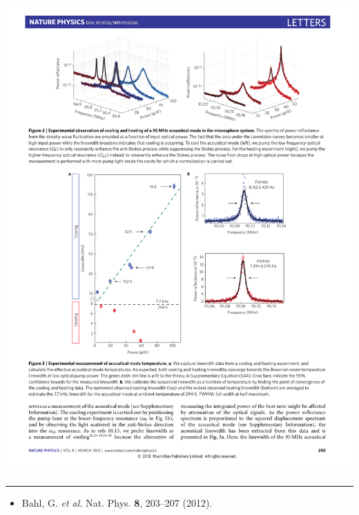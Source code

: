 \documentclass{beamer}
\def\etal{\emph{et al. }}
\begin{document}
\begin{frame}
\begin{columns}[onlytextwidth]
\begin{column}{0.4\textwidth}
\begin{center}
\includegraphics[width=1.0\columnwidth]{f7.pdf}
\end{center}
\end{column}
\end{columns}

\vspace{4em}
\noindent\rule{0.1\textwidth}{0.5pt}

\begin{itemize}
\item \tiny{Bahl, G. \etal Nat. Phys. \textbf{8}, 203–207 (2012).}
\end{itemize}
\end{frame}

\end{document}
